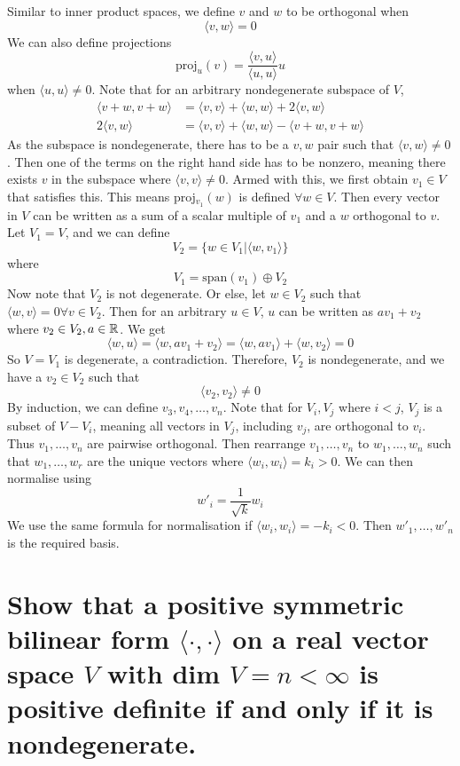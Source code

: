 \documentclass[answers]{exam}
\begin{document}
\begin{questions}
\begin{parts}
	\begin{solution}
		Similar to inner product spaces, we define $v$ and $w$ to be orthogonal when
		$$\langle v,w \rangle = 0$$
		We can also define projections
		$$\text{proj}_u(v) = \frac{\langle v,u \rangle}{\langle u,u \rangle}u$$
		when $\langle u,u \rangle \neq 0$. Note that for an arbitrary nondegenerate subspace of $V$,
		\begin{align*}
			\langle v+w,v+w \rangle &= \langle v,v \rangle + \langle w,w \rangle + 2\langle v,w \rangle \\
			2\langle v,w \rangle &= \langle v,v \rangle + \langle w,w \rangle - \langle v+w,v+w \rangle
		\end{align*}
		As the subspace is nondegenerate, there has to be a $v,w$ pair such that $\langle v,w \rangle \neq 0$. Then one of the terms on the right hand side has to be nonzero, meaning there exists $v$ in the subspace where $\langle v,v \rangle \neq 0$. Armed with this, we first obtain $v_1 \in V$ that satisfies this. This means proj$_{v_1}(w)$ is defined $\forall w \in V$. Then every vector in $V$ can be written as a sum of a scalar multiple of $v_1$ and a $w$ orthogonal to $v$. Let $V_1 = V$, and we can define
		$$V_2 = \{w \in V_1 | \langle w,v_1 \rangle \}$$
		where
		$$V_1 = \text{span}(v_1) \oplus V_2$$
		Now note that $V_2$ is not degenerate. Or else, let $w \in V_2$ such that $\langle w,v \rangle = 0 \forall v \in V_2$. Then for an arbitrary $u \in V$, $u$ can be written as $av_1 + v_2$ where $v_2 \in V_2, a \in \mathbb{R}$. We get
		$$\langle w,u \rangle = \langle w,av_1 + v_2 \rangle = \langle w,av_1 \rangle + \langle w,v_2 \rangle = 0$$
		So $V=V_1$ is degenerate, a contradiction. Therefore, $V_2$ is nondegenerate, and we have a $v_2 \in V_2$ such that
		$$\langle v_2,v_2 \rangle \neq 0$$
		By induction, we can define $v_3,v_4,\dots,v_n$. Note that for $V_i,V_j$ where $i < j$, $V_j$ is a subset of $V - V_i$, meaning all vectors in $V_j$, including $v_j$, are orthogonal to $v_i$. Thus $v_1,\dots,v_n$ are pairwise orthogonal. Then rearrange $v_1,\dots,v_n$ to $w_1,\dots,w_n$ such that $w_1,\dots,w_r$ are the unique vectors where $\langle w_i,w_i \rangle = k_i > 0$. We can then normalise using
		$$w'_i = \frac{1}{\sqrt{k}}w_i$$
		We use the same formula for normalisation if $\langle w_i,w_i \rangle = -k_i  < 0$. Then $w'_1,\dots,w'_n$ is the required basis.
	\end{solution}

	\part{Show that a positive symmetric bilinear form $\langle \cdot,\cdot \rangle$ on a real vector space $V$ with dim $V = n < \infty$ is positive definite if and only if it is nondegenerate.}


\end{parts}
\end{questions}
\end{document}
